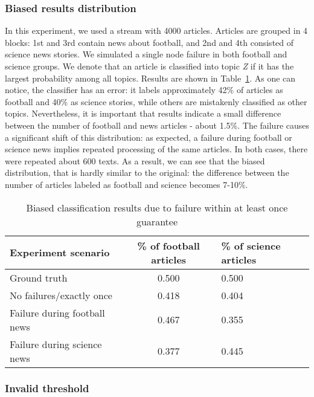 \subsubsection{Biased results distribution}

In this experiment, we used a stream with 4000 articles. Articles are grouped in 4 blocks: 1st and 3rd contain news about football, and 2nd and 4th consisted of science news stories. We simulated a single node failure in both football and science groups. We denote that an article is classified into topic {\em Z} if it has the largest probability among all topics. Results are shown in Table~\ref{biased_results}. As one can notice, the classifier has an error: it labels approximately 42\% of articles as football and 40\% as science stories, while others are mistakenly classified as other topics. Nevertheless, it is important that results indicate a small difference between the number of football and news articles - about 1.5\%. The failure causes a significant shift of this distribution: as expected, a failure during football or science news implies repeated processing of the same articles. In both cases, there were repeated about 600 texts. As a result, we can see that the biased distribution, that is hardly similar to the original: the difference between the number of articles labeled as football and science becomes 7-10\%. 

\begin{table}[htbp]
\caption{Biased classification results due to failure within at least once guarantee}
\begin{threeparttable}
\begin{tabular}{lcl}
Experiment scenario    & \% of football articles & \% of science articles    \\
\hline
Ground truth   &   0.500    &   0.500    \\
No failures/exactly once   &   0.418    &   0.404    \\
Failure during football news   &   0.467    &   0.355    \\
Failure during science news   &   0.377    &   0.445    \\
\end{tabular}
\end{threeparttable}
\label{biased_results}
\end{table}

\subsubsection{Invalid threshold}

